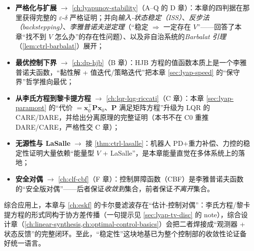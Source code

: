 \begin{itemize}
  \item \textbf{严格化与扩展} $\to$ \cref{ch:lyapunov-stability}（A–Q 的 D 章）：本章的四判据在那里获得完整的 $\varepsilon$-$\delta$ 严格证明；并向\emph{输入-状态稳定（ISS）}、\emph{反步法（backstepping）}、\emph{李雅普诺夫逆定理}（“稳定 $\Rightarrow$ 一定存在 $V$”——回答了本章“找不到 $V$ 怎么办”的存在性问题）、以及非自治系统的\emph{Barbalat 引理}（\cref{lem:ctrl-barbalat}）展开；
  \item \textbf{最优控制下界} $\to$ \cref{ch:dp-hjb}（B 章）：HJB 方程的值函数本质上是一个李雅普诺夫函数，“黏性解 + 值迭代/策略迭代”把本章 \cref{sec:lyap-speed} 的“保守界”哲学推向最优；
  \item \textbf{从李氏方程到黎卡提方程} $\to$ \cref{ch:lqr-lqg-riccati}（C 章）：本章 \cref{sec:lyap-paramopt} 的“代价 $=\mathbf{x}_0^\top\mathbf{P}\mathbf{x}_0$、$\mathbf{P}$ 满足矩阵方程”升级为 LQR 的 CARE/DARE，并给出分离原理的完整证明（本书不在 C0 重推 DARE/CARE，严格性交 C 章）；
  \item \textbf{无源性与 LaSalle} $\to$ 接 \cref{thm:ctrl-lasalle}：机器人 PD+重力补偿、力控的稳定性证明大量依赖“能量型 $V$ + LaSalle”，是本章能量直觉在多体系统上的落地；
  \item \textbf{安全对偶} $\to$ \cref{ch:clf-cbf}（F 章）：控制屏障函数（CBF）是李雅普诺夫函数的“安全版对偶”——后者保证\emph{收敛到}集合，前者保证\emph{不离开}集合。
\end{itemize}

\noindent 综合应用上，本章与 \cref{ch:eskf} 的卡尔曼滤波存在“估计-控制对偶”：李氏方程/黎卡提方程的形式同构于协方差传播（一句提示见 \cref{sec:lyap-tv-disc} 的 note），综合设计章（\cref{ch:linear-synthesis,ch:optimal-control-basics}）会把二者焊接成“观测器 + 状态反馈”的完整闭环。至此，“稳定性”这块地基已为整个控制部的收敛性论证备好统一语言。
